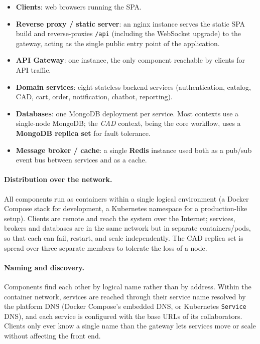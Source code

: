 \begin{itemize}
  \item \textbf{Clients}: web browsers running the SPA.

  \item \textbf{Reverse proxy / static server}: an nginx instance serves the
  static SPA build and reverse-proxies \texttt{/api} (including the WebSocket
  upgrade) to the gateway, acting as the single public entry point of the
  application.

  \item \textbf{API Gateway}: one instance, the only component reachable by
  clients for API traffic.

  \item \textbf{Domain services}: eight stateless backend services
  (authentication, catalog, CAD, cart, order, notification, chatbot,
  reporting).

  \item \textbf{Databases}: one MongoDB deployment per service. Most contexts
  use a single-node MongoDB; the \emph{CAD} context, being the core workflow,
  uses a \textbf{MongoDB replica set} for fault tolerance.

  \item \textbf{Message broker / cache}: a single \textbf{Redis} instance used
  both as a pub/sub event bus between services and as a cache.
\end{itemize}

\paragraph{Distribution over the network.} All
components run as containers within a single logical environment (a Docker
Compose stack for development, a Kubernetes namespace for a production-like
setup). Clients are remote and reach the system over the Internet; services,
brokers and databases are in the same network but in separate
containers/pods, so that each can fail, restart, and scale independently. The
CAD replica set is spread over three separate members to tolerate the loss of a node.

\paragraph{Naming and discovery.} Components find each other by logical name
rather than by address. Within the container network, services are reached
through their service name resolved by the platform DNS (Docker Compose's
embedded DNS, or Kubernetes \texttt{Service} DNS), and each service is
configured with the base URLs of its collaborators. Clients only ever know a
single name than the gateway lets services move or scale without affecting the front end.

